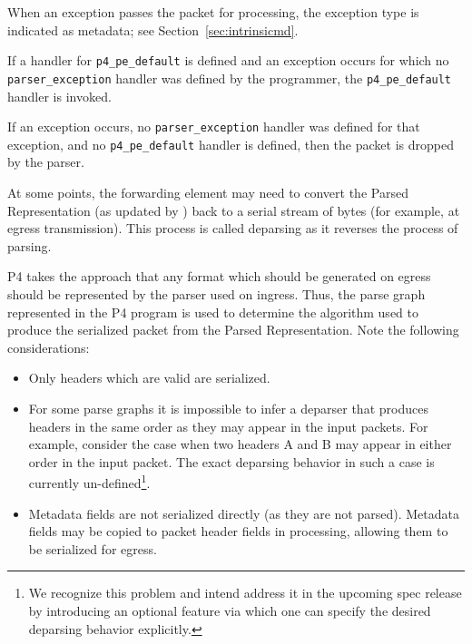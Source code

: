 \documentclass[12pt]{article}
\begin{document}
When an exception passes the packet for \matchaction processing, the exception 
type is indicated as metadata; see Section~\ref{sec:intrinsicmd}.


If a handler for \texttt{p4_pe_default} is defined and an exception occurs for which 
no \\
\texttt{parser_exception} handler was defined by the programmer, the \texttt{p4_pe_default} handler 
is invoked. 

If an exception occurs, no \texttt{parser_exception} handler was defined for that 
exception, and no \texttt{p4_pe_default} handler is defined, then the packet is 
dropped by the parser. 


At some points, the forwarding element may need to convert the Parsed 
Representation (as updated by \matchaction) back to a serial stream of bytes 
(for example, at egress transmission). This process is called deparsing as it 
reverses the process of parsing.

P4 takes the approach that any format which should be generated on egress 
should be represented by the parser used on ingress.  Thus, the parse graph 
represented in the P4 program is used to determine the algorithm used to produce 
the serialized packet from the Parsed Representation.  Note the following 
considerations:

\begin{itemize}
\item
Only headers which are valid are serialized.
\item
For some parse graphs it is impossible to infer a deparser that
produces headers in the same order as they may appear in the input
packets. For example, consider the case when two headers A and B may
appear in either order in the input packet. The exact deparsing behavior
in such a case is currently un-defined\footnote{We recognize this problem and
intend address it in the upcoming spec release by introducing an optional feature
via which one can specify the desired deparsing behavior explicitly.}.
\item
Metadata fields are not serialized directly (as they are not parsed).  Metadata 
fields may be copied to packet header fields in \matchaction processing, allowing 
them to be serialized for egress.
\end{itemize}
\end{document}
